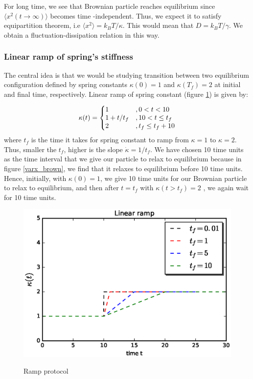 \documentclass[11pt,a4paper]{article}
\begin{document}
For long time, we see that Brownian particle reaches equilibrium since $\langle x^2 (t\rightarrow \infty) \rangle$ becomes time -independent. Thus, we expect it to satisfy equipartition theorem, i.e $ \langle x^2 \rangle = k_B T/ \kappa$. This would mean that $D=k_B T/\gamma$. We obtain a fluctuation-dissipation relation in this way.


\subsubsection*{Linear ramp of spring's stiffness}
The central idea is that we would be studying transition between two equilibrium configuration defined by spring constants $\kappa(0)=1$ and $\kappa(T_f)=2$ at initial and final time, respectively. Linear ramp of spring constant (figure \ref{protocol_ramp}) is given by:

\begin{equation}
  \kappa(t)=\left\{
  \begin{array}{@{}ll@{}}
    1 & ,0< t <10 \\
    1+ t/t_f & ,  10 < t \leq t_f \\
    2 & , t_f \leq  t_f+10 \\
  \end{array}\right.
\end{equation}
where $t_f$ is the time it takes for spring constant to ramp from $\kappa=1$ to $\kappa=2$. Thus, smaller the $t_f$, higher is the slope $ \dot{\kappa}=1/t_f$.  We have chosen 10 time units as the time interval that we give our particle to relax to equilibrium because in figure \ref{varx_brown}, we find that it relaxes to equilibrium before 10 time units. Hence, initially, with $\kappa(0)=1$, we give 10 time units for our Brownian particle to relax to equilibrium, and then after $t=t_f$ with $\kappa(t>t_f)=2$ , we again wait for 10 time units.

\begin{figure}[!htbp]
\centering
\includegraphics[scale=0.67]{ramp_protocol.eps}\\
\caption{ Ramp protocol}
\label{protocol_ramp}
\end{figure}
\end{document}
